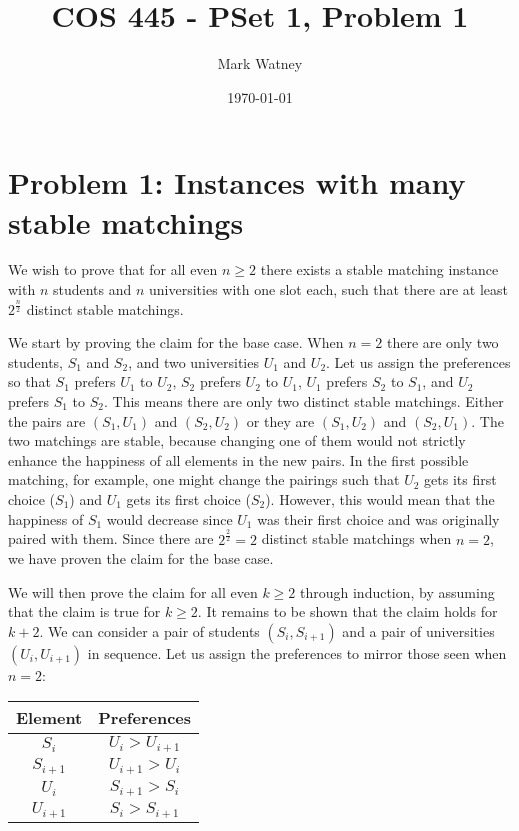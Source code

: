\documentclass[12pt]{article}%
\begin{document}
\title{COS 445 - PSet 1, Problem 1} %
\author{Mark Watney} %
\date{\today}
\maketitle
\section*{Problem 1: Instances with many stable matchings}
We wish to prove that for all even $n \ge 2$ there exists a stable matching instance with $n$ students and $n$ universities with one slot each, such that there are at least $2^{\frac{n}{2}}$ distinct stable matchings.

We start by proving the claim for the base case. When $n = 2$ there are only two students, $S_1$ and $S_2$, and two universities $U_1$ and $U_2$. Let us assign the preferences so that $S_1$ prefers $U_1$ to $U_2$, $S_2$ prefers $U_2$ to $U_1$, $U_1$ prefers $S_2$ to $S_1$, and $U_2$ prefers $S_1$ to $S_2$. This means there are only two distinct stable matchings. Either the pairs are $(S_1, U_1)$ and $(S_2, U_2)$ or they are $(S_1, U_2)$ and $(S_2, U_1)$. The two matchings are stable, because changing one of them would not strictly enhance the happiness of all elements in the new pairs. In the first possible matching, for example, one might change the pairings such that $U_2$ gets its first choice ($S_1$) and $U_1$ gets its first choice ($S_2$). However, this would mean that the happiness of $S_1$ would decrease since $U_1$ was their first choice and was originally paired with them. Since there are $2^{\frac{2}{2}} = 2$ distinct stable matchings when $n = 2$, we have proven the claim for the base case. 

We will then prove the claim for all even $k \ge 2$ through induction, by assuming that the claim is true for $k \ge 2$. It remains to be shown that the claim holds for $k + 2$. 
We can consider a pair of students $(S_i, S_{i + 1})$ and a pair of universities $(U_i, U_{i + 1})$ in sequence. Let us assign the preferences to mirror those seen when $n = 2$:

\begin{center}
\begin{tabular}{|c|c|}
\hline
Element     & Preferences       \\ \hline
$S_i$       & $U_i > U_{i+1}$   \\ \hline
$S_{i + 1}$ & $U_{i+1} > U_i$   \\ \hline
$U_i$       & $S_{i + 1} > S_i$ \\ \hline
$U_{i+1}$   & $S_i > S_{i + 1}$ \\ \hline
\end{tabular}
\end{center}
\end{document}
